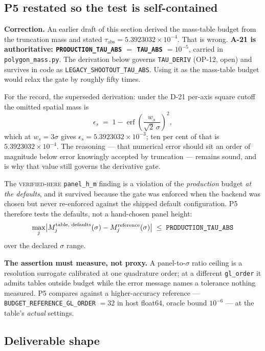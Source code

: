 \documentclass[11pt]{article}
\newcommand{\vfy}{\textsc{verified-here}}
\renewcommand{\tt}[1]{\texttt{#1}}
\newcommand{\tabs}{\ensuremath{\tau_{\mathrm{abs}}}}
\newenvironment{ruling}{\begin{leftbar}\small}{\end{leftbar}}
\begin{document}
\subsection{P5 restated so the test is self-contained}

\begin{ruling}
\noindent\textbf{Correction.} An earlier draft of this section derived the mass-table
budget from the truncation mass and stated $\tabs = 5.3923032\times10^{-4}$. That is
wrong. \textbf{A-21 is authoritative: \tt{PRODUCTION\_TAU\_ABS} $=$ \tt{TAU\_ABS} $=
10^{-5}$}, carried in \tt{polygon\_mass.py}. The derivation below governs \tt{TAU\_DERIV}
(OP-12, open) and survives in code as \tt{LEGACY\_SHOOTOUT\_TAU\_ABS}. Using it as the
mass-table budget would relax the gate by roughly fifty times.
\end{ruling}

For the record, the superseded derivation: under the D-21 per-axis square cutoff the
omitted spatial mass is
\[
  \epsilon_s \;=\; 1 - \operatorname{erf}\!\left(\frac{w_s}{\sqrt{2}\,\sigma}\right)^{\!2},
\]
which at $w_s = 3\sigma$ gives $\epsilon_s = 5.3923032\times10^{-3}$; ten per cent of that
is $5.3923032\times10^{-4}$. The reasoning --- that numerical error should sit an order of
magnitude below error knowingly accepted by truncation --- remains sound, and is why that
value still governs the derivative gate.

The \vfy{} \tt{panel\_h\_m} finding is a violation of the \emph{production} budget
\emph{at the defaults}, and it survived because the gate was enforced when the backend was
chosen but never re-enforced against the shipped default configuration. P5 therefore tests
the defaults, not a hand-chosen panel height:
\[
  \max_j \bigl| M_j^{\text{table, defaults}}(\sigma) - M_j^{\text{reference}}(\sigma) \bigr|
  \;\le\; \text{\tt{PRODUCTION\_TAU\_ABS}}
\]
over the declared $\sigma$ range.

\begin{ruling}
\noindent\textbf{The assertion must measure, not proxy.} A panel-to-$\sigma$ ratio ceiling
is a resolution surrogate calibrated at one quadrature order; at a different \tt{gl\_order}
it admits tables outside budget while the error message names a tolerance nothing measured.
P5 compares against a higher-accuracy reference --- \tt{BUDGET\_REFERENCE\_GL\_ORDER} $=
32$ in host float64, oracle bound $10^{-6}$ --- at the table's \emph{actual} settings.
\end{ruling}

\subsection{Deliverable shape}
\end{document}
